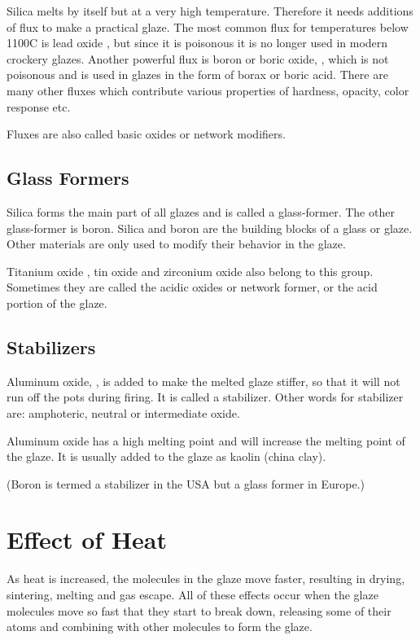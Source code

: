Silica melts by itself but at a very high temperature. Therefore it needs 
additions of flux to make a practical glaze. The most common flux for 
temperatures below 1100\degree C is lead oxide , but since it is 
poisonous it is no longer used in modern crockery glazes. Another powerful flux 
is boron or boric oxide, , which is not poisonous and is used in 
glazes in 
the form of borax or boric acid. There are many other fluxes which contribute 
various properties of hardness, opacity, color response etc.

Fluxes are also called basic oxides or network modifiers.
\subsection{Glass Formers}
Silica forms the main part of all glazes and is called a glass-former. The 
other glass-former is boron. Silica and boron are the building blocks of a 
glass or glaze. Other materials are only used to modify their behavior in the 
glaze.

Titanium oxide , tin oxide  and zirconium oxide 
 also belong to this group. Sometimes they are called the acidic 
oxides or network former, or the acid portion of the glaze.
\subsection{Stabilizers}
Aluminum oxide, , is added to make the melted glaze stiffer, so that 
it will not run off the pots during firing. It is called a stabilizer. Other 
words for stabilizer are: amphoteric, neutral or intermediate oxide.

Aluminum oxide has a high melting point and will increase the melting point of 
the glaze. It is usually added to the glaze as kaolin (china clay).

(Boron is termed a stabilizer in the USA but a glass former in Europe.)
\section{Effect of Heat}
As heat is increased, the molecules in the glaze move faster, resulting in 
drying, sintering, melting and gas escape. All of these effects occur when the 
glaze molecules move so fast that they start to break down, releasing some of 
their atoms and combining with other molecules to form the glaze.
